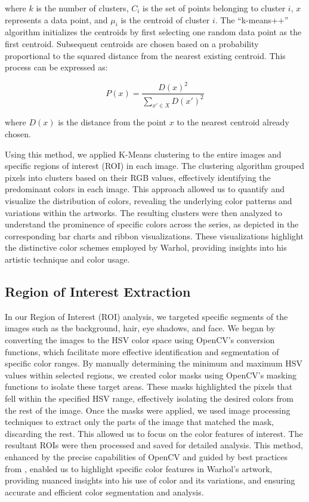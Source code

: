 \documentclass{article}
\begin{document}
where \(k\) is the number of clusters, \(C_i\) is the set of points
belonging to cluster \(i\), \(x\) represents a data point, and \(\mu_i\)
is the centroid of cluster \(i\). The ``k-means++'' algorithm
initializes the centroids by first selecting one random data point as
the first centroid. Subsequent centroids are chosen based on a
probability proportional to the squared distance from the nearest
existing centroid. This process can be expressed as:

\begin{equation}
  P(x) = \frac{D(x)^2}{\sum_{x' \in X} D(x')^2}
\end{equation}

where \(D(x)\) is the distance from the point \(x\) to the nearest
centroid already chosen.

Using this method, we applied K-Means clustering to the entire images
and specific regions of interest (ROI) in each image. The clustering
algorithm grouped pixels into clusters based on their RGB values,
effectively identifying the predominant colors in each image. This
approach allowed us to quantify and visualize the distribution of
colors, revealing the underlying color patterns and variations within
the artworks. The resulting clusters were then analyzed to understand
the prominence of specific colors across the series, as depicted in the
corresponding bar charts and ribbon visualizations. These visualizations
highlight the distinctive color schemes employed by Warhol, providing
insights into his artistic technique and color usage.

\hypertarget{region-of-interest-extraction}{%
\subsection{Region of Interest Extraction}\label{region-of-interest-extraction}}

In our Region of Interest (ROI) analysis, we targeted specific segments
of the images such as the background, hair, eye shadows, and face. We
began by converting the images to the HSV color space using OpenCV's
conversion functions, which facilitate more effective identification and
segmentation of specific color ranges. By manually determining the
minimum and maximum HSV values within selected regions, we created color
masks using OpenCV's masking functions to isolate these target areas.
These masks highlighted the pixels that fell within the specified HSV
range, effectively isolating the desired colors from the rest of the
image. Once the masks were applied, we used image processing techniques
to extract only the parts of the image that matched the mask, discarding
the rest. This allowed us to focus on the color features of interest.
The resultant ROIs were then processed and saved for detailed analysis.
This method, enhanced by the precise capabilities of OpenCV and guided
by best practices from \citet{opencv_2012}, enabled us to highlight
specific color features in Warhol's artwork, providing nuanced insights
into his use of color and its variations, and ensuring accurate and
efficient color segmentation and analysis.
\end{document}
